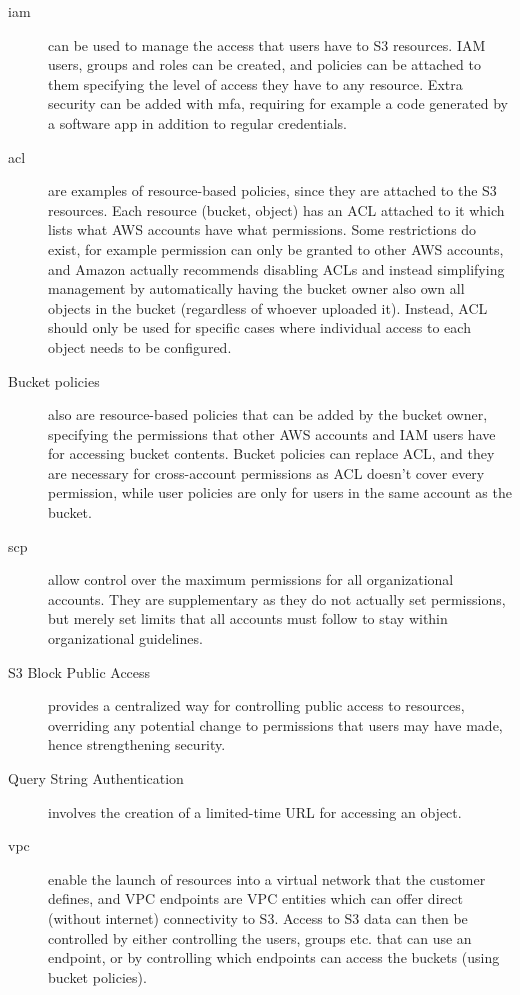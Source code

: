 \begin{description}
    \item[\ac{iam}] can be used to manage the access that users have to S3 resources. IAM users, groups and roles can be created, and policies can be attached to them specifying the level of access they have to any resource. Extra security can be added with \ac{mfa}, requiring for example a code generated by a software app in addition to regular credentials.

    \item[\ac{acl}] are examples of resource-based policies, since they are attached to the S3 resources. Each resource (bucket, object) has an ACL attached to it which lists what AWS accounts have what permissions. Some restrictions do exist, for example permission can only be granted to other AWS accounts, and Amazon actually recommends disabling ACLs and instead simplifying management by automatically having the bucket owner also own all objects in the bucket (regardless of whoever uploaded it). Instead, ACL should only be used for specific cases where individual access to each object needs to be configured.

    \item[Bucket policies] also are resource-based policies that can be added by the bucket owner, specifying the permissions that other AWS accounts and IAM users have for accessing bucket contents. Bucket policies can replace ACL, and they are necessary for cross-account permissions as ACL doesn't cover every permission, while user policies are only for users in the same account as the bucket.

    \item[\ac{scp}] allow control over the maximum permissions for all organizational accounts. They are supplementary as they do not actually set permissions, but merely set limits that all accounts must follow to stay within organizational guidelines.

    \item[S3 Block Public Access] provides a centralized way for controlling public access to resources, overriding any potential change to permissions that users may have made, hence strengthening security.

    \item[Query String Authentication] involves the creation of a limited-time URL for accessing an object.

    \item [\ac{vpc}] enable the launch of resources into a virtual network that the customer defines, and VPC endpoints are VPC entities which can offer direct (without internet) connectivity to S3. Access to S3 data can then be controlled by either controlling the users, groups etc. that can use an endpoint, or by controlling which endpoints can access the buckets (using bucket policies).
\end{description}

